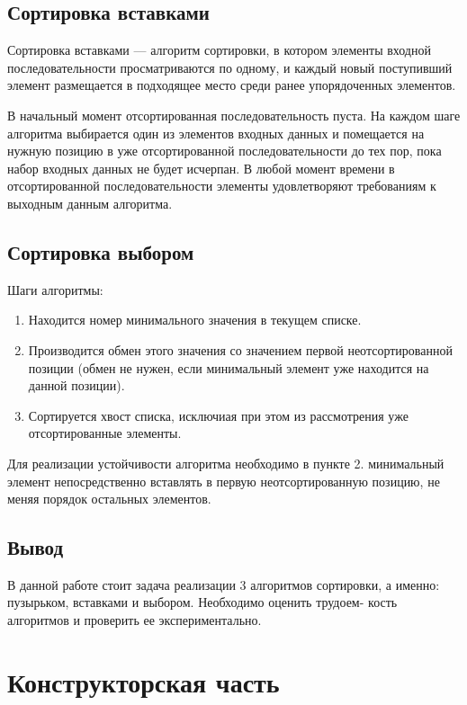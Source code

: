 \documentclass[a4paper,14pt, unknownkeysallowed]{extreport}
\begin{document}
\section{Сортировка вставками}

Сортировка вставками — алгоритм сортировки, в котором элементы входной последовательности просматриваются по одному, и каждый новый поступивший элемент размещается в подходящее место среди ранее упорядоченных элементов.


В начальный момент отсортированная последовательность пуста. На каждом шаге алгоритма выбирается один из элементов входных данных и помещается на нужную позицию в уже отсортированной последовательности до тех пор, пока набор входных данных не будет исчерпан. В любой момент времени в отсортированной последовательности элементы удовлетворяют требованиям к выходным данным алгоритма.

\section{Сортировка выбором}

Шаги алгоритмы:

\begin{enumerate}
    \item Находится номер минимального значения в текущем списке.
    \item Производится обмен этого значения со значением первой неотсортированной позиции (обмен не нужен, если минимальный элемент уже находится на данной позиции).
    \item Сортируется хвост списка, исключиая при этом из рассмотрения уже отсортированные элементы.
\end{enumerate}

Для реализации устойчивости алгоритма необходимо в пункте 2. минимальный элемент непосредственно вставлять в первую неотсортированную позицию, не меняя порядок остальных элементов.

\section*{Вывод}

В данной работе стоит задача реализации 3 алгоритмов сортировки, а именно: пузырьком, вставками и выбором. Необходимо оценить трудоем- кость алгоритмов и проверить ее экспериментально.

\chapter{Конструкторская часть}
\end{document}
